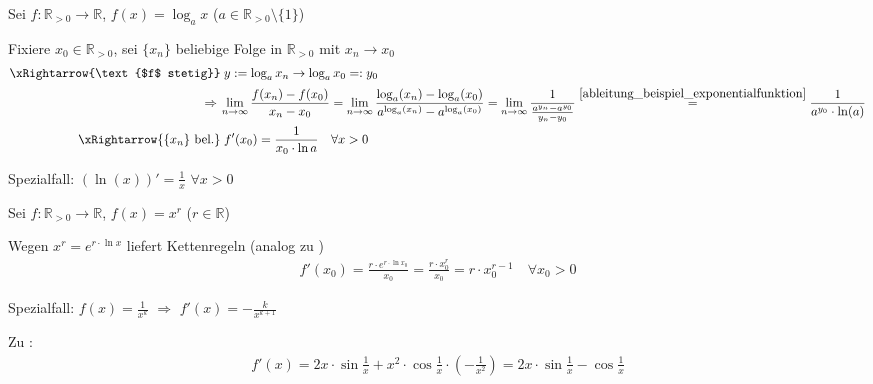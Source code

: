 \begin{example}[Logarithmus]
	Sei $f:\mathbb{R}_{>0} \to \mathbb{R}$, $f(x) = \log_a x$ ($a\in\mathbb{R}_{>0}\setminus\{1\}$)
	
	Fixiere $x_0\in \mathbb{R}_{>0}$, sei $\{x_n\}$ beliebige Folge in $\mathbb{R}_{>0}$ mit $x_n\to x_0$
	\zeroAmsmathAlignVSpaces*[5pt] \begin{alignat*}{1}
		\xRightarrow{\text{$f$ stetig}}\;& y:= \log_a x_n \to \log_a x_0 =: y_0 \\
		\Rightarrow\;\;&\!\! \lim\limits_{n\to \infty} \frac{f(x_n) - f(x_0)}{x_n - x_0} = \lim\limits_{n\to \infty} \frac{\log_a(x_n) - \log_a(x_0)}{a^{\log_a(x_n)} - a^{\log_a(x_0)}} = \lim\limits_{n\to \infty} \dfrac{1}{\frac{a^{y_n} - a^{y_0}}{y_n - y_0}} \overset{\ref{ableitung_beispiel_exponentialfunktion}}{=}{\frac{1}{a^{y_0}\cdot \ln(a)}} \\
		\xRightarrow{\{x_n\}\text{ bel.}}\;& f'(x_0) = \frac{1}{x_0\cdot \ln a}\quad\forall x>0
	\end{alignat*}
	
	Spezialfall: $(\ln(x))' = \frac{1}{x}$ $\forall x>0$
	\begin{center}\end{center}
\end{example}

\begin{example}
	Sei $f:\mathbb{R}_{>0}\to \mathbb{R}$, $f(x) = x^r$ ($r\in\mathbb{R}$)
	
	Wegen $x^r = e^{r\cdot \ln x}$ liefert Kettenregeln (analog zu ) \begin{align*}
		f'(x_0) = \frac{r\cdot e^{r\cdot \ln x_0}}{x_0} = \frac{r\cdot x_0^r}{x_0} = r\cdot x_0^{r - 1} \quad\forall x_0>0
	\end{align*}
	
	Spezialfall: $f(x) = \frac{1}{x^k}$ $\Rightarrow$ $f'(x) = - \frac{k}{x^{k+1}}$
	
	Zu :\begin{align*}
		f'(x) = 2x\cdot \sin\frac{1}{x} + x^2\cdot \cos\frac{1}{x} \cdot \left( - \frac{1}{x^2}\right) = 2x\cdot \sin\frac{1}{x} - \cos\frac{1}{x}
	\end{align*}
\end{example}

